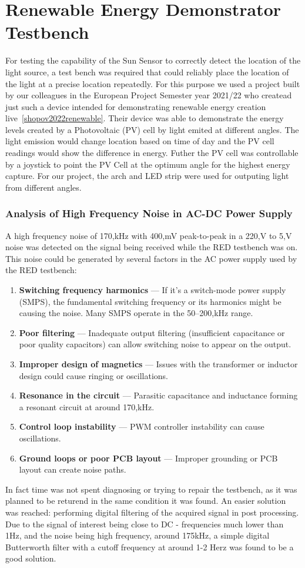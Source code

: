 \section{Renewable Energy Demonstrator Testbench}
For testing the capability of the Sun Sensor to correctly detect the location of the light source, a test bench was required that could reliably place the location of the light at a precise location repeatedly. For this purpose we used a project built by our colleagues in the European Project Semester year 2021/22 who createad just such a device intended for demonstrating renewable energy creation live~\ref{shopov2022renewable}. Their device was able to demonstrate the energy levels created by a Photovoltaic (PV) cell by light emited at different angles. The light emission would change location based on time of day and the PV cell readings would show the difference in energy. Futher the PV cell was controllable by a joystick to point the PV Cell at the optimum angle for the highest energy capture. For our project, the arch and LED strip were used for outputing light from different angles.
\subsubsection*{Analysis of High Frequency Noise in AC-DC Power Supply}
A high frequency noise of 170,kHz with 400,mV peak-to-peak in a 220,V to 5,V noise was detected on the signal being received while the RED testbench was on. This noise could be generated by several factors in the AC power supply used by the RED testbench:
\begin{enumerate}[label=\arabic*.]
\item \textbf{Switching frequency harmonics} --- If it's a switch-mode power supply (SMPS), the fundamental switching frequency or its harmonics might be causing the noise. Many SMPS operate in the 50--200,kHz range.
\item \textbf{Poor filtering} --- Inadequate output filtering (insufficient capacitance or poor quality capacitors) can allow switching noise to appear on the output.
\item \textbf{Improper design of magnetics} --- Issues with the transformer or inductor design could cause ringing or oscillations.
\item \textbf{Resonance in the circuit} --- Parasitic capacitance and inductance forming a resonant circuit at around 170,kHz.
\item \textbf{Control loop instability} --- PWM controller instability can cause oscillations.
\item \textbf{Ground loops or poor PCB layout} --- Improper grounding or PCB layout can create noise paths.
\end{enumerate}
In fact time was not spent diagnosing or trying to repair the testbench, as it was planned to be returend in the same condition it was found. An easier solution was reached: performing digital filtering of the acquired signal in post processing. Due to the signal of interest being close to DC - frequencies much lower than 1Hz, and the noise being high frequency, around 175kHz, a simple digital Butterworth filter with a cutoff frequency at around 1-2 Herz was found to be a good solution.